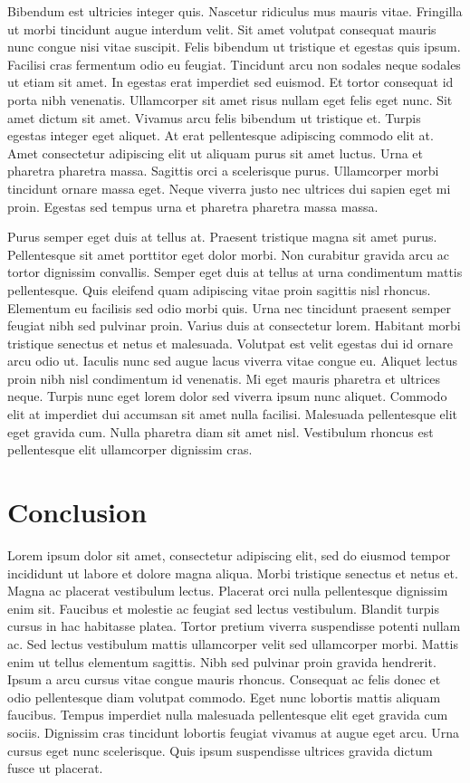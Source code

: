 \documentclass[12pt, oneside, a4paper]{article}
\begin{document}
Bibendum est ultricies integer quis. Nascetur ridiculus mus mauris vitae. Fringilla ut morbi tincidunt augue interdum velit. Sit amet volutpat consequat mauris nunc congue nisi vitae suscipit. Felis bibendum ut tristique et egestas quis ipsum. Facilisi cras fermentum odio eu feugiat. Tincidunt arcu non sodales neque sodales ut etiam sit amet. In egestas erat imperdiet sed euismod. Et tortor consequat id porta nibh venenatis. Ullamcorper sit amet risus nullam eget felis eget nunc. Sit amet dictum sit amet. Vivamus arcu felis bibendum ut tristique et. Turpis egestas integer eget aliquet. At erat pellentesque adipiscing commodo elit at. Amet consectetur adipiscing elit ut aliquam purus sit amet luctus. Urna et pharetra pharetra massa. Sagittis orci a scelerisque purus. Ullamcorper morbi tincidunt ornare massa eget. Neque viverra justo nec ultrices dui sapien eget mi proin. Egestas sed tempus urna et pharetra pharetra massa massa.

Purus semper eget duis at tellus at. Praesent tristique magna sit amet purus. Pellentesque sit amet porttitor eget dolor morbi. Non curabitur gravida arcu ac tortor dignissim convallis. Semper eget duis at tellus at urna condimentum mattis pellentesque. Quis eleifend quam adipiscing vitae proin sagittis nisl rhoncus. Elementum eu facilisis sed odio morbi quis. Urna nec tincidunt praesent semper feugiat nibh sed pulvinar proin. Varius duis at consectetur lorem. Habitant morbi tristique senectus et netus et malesuada. Volutpat est velit egestas dui id ornare arcu odio ut. Iaculis nunc sed augue lacus viverra vitae congue eu. Aliquet lectus proin nibh nisl condimentum id venenatis. Mi eget mauris pharetra et ultrices neque. Turpis nunc eget lorem dolor sed viverra ipsum nunc aliquet. Commodo elit at imperdiet dui accumsan sit amet nulla facilisi. Malesuada pellentesque elit eget gravida cum. Nulla pharetra diam sit amet nisl. Vestibulum rhoncus est pellentesque elit ullamcorper dignissim cras.

\section*{Conclusion}
Lorem ipsum dolor sit amet, consectetur adipiscing elit, sed do eiusmod tempor incididunt ut labore et dolore magna aliqua. Morbi tristique senectus et netus et. Magna ac placerat vestibulum lectus. Placerat orci nulla pellentesque dignissim enim sit. Faucibus et molestie ac feugiat sed lectus vestibulum. Blandit turpis cursus in hac habitasse platea. Tortor pretium viverra suspendisse potenti nullam ac. Sed lectus vestibulum mattis ullamcorper velit sed ullamcorper morbi. Mattis enim ut tellus elementum sagittis. Nibh sed pulvinar proin gravida hendrerit. Ipsum a arcu cursus vitae congue mauris rhoncus. Consequat ac felis donec et odio pellentesque diam volutpat commodo. Eget nunc lobortis mattis aliquam faucibus. Tempus imperdiet nulla malesuada pellentesque elit eget gravida cum sociis. Dignissim cras tincidunt lobortis feugiat vivamus at augue eget arcu. Urna cursus eget nunc scelerisque. Quis ipsum suspendisse ultrices gravida dictum fusce ut placerat.
\end{document}
